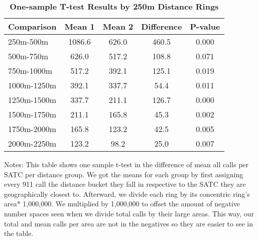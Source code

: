 \begin{table}[htbp]
\centering
\begin{tabular}{l|c c c c}
\hline
Comparison & Mean 1 & Mean 2 & Difference & P-value \\
\hline
250m-500m & 1086.6 & 626.0 & 460.5 & 0.000 \\
500m-750m & 626.0 & 517.2 & 108.8 & 0.071 \\
750m-1000m & 517.2 & 392.1 & 125.1 & 0.019 \\
1000m-1250m & 392.1 & 337.7 & 54.4 & 0.011 \\
1250m-1500m & 337.7 & 211.1 & 126.7 & 0.000 \\
1500m-1750m & 211.1 & 165.8 & 45.3 & 0.002 \\
1750m-2000m & 165.8 & 123.2 & 42.5 & 0.005 \\
2000m-2250m & 123.2 & 98.2 & 25.0 & 0.007 \\
\hline
\end{tabular}
\caption{\textbf{One-sample T-test Results by 250m Distance Rings}}
\label{tab:Table3}
\centering\small{Notes: This table shows one sample t-test in the difference of mean all calls per SATC per distance group. We got the means for each group by first assigning every 911 call the distance bucket they fall in respective to the SATC they are geographically closest to. Afterward, we divide each ring by its concentric ring's area* 1,000,000. We multiplied by 1,000,000 to offset the amount of negative number spaces seen when we divide total calls by their large areas. This way, our total and mean calls per area are not in the negatives so they are easier to see in the table. }
\end{table}
